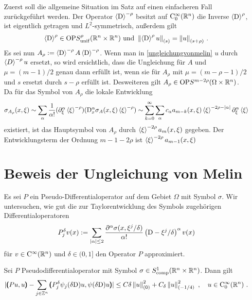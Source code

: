 Zuerst soll die allgemeine Situation im Satz auf einen einfacheren Fall zurückgeführt werden. Der Operator $\braket{\mathrm D}^{-\rho}$ besitzt auf $\mathrm C^\infty_0(\mathbb R^n)$ die Inverse $\braket{\mathrm D}^{\rho}$, ist eigentlich getragen und $L^2$-symmetrisch, außerdem gilt
\begin{align*}
\braket{\mathrm D}^\rho\in\mathrm{OP} S_\mathrm{unif}^\rho(\mathbb R^n\times\mathbb R^n)\text{ und }\left\lVert\braket{\mathrm D}^\rho u\right\rVert_{(s)}=\left\lVert u\right\rVert_{(s+\rho)}\,.
\end{align*}
Es sei nun $A_\rho:=\braket{\mathrm D}^{-\rho}A\braket{\mathrm D}^{-\rho}$. Wenn man in \eqref{ungleichungvonmelin} $u$ durch $\braket{D}^{-\rho}u$ ersetzt, so wird ersichtlich, dass die Ungleichung für $A$ und $\mu=(m-1)/2$ genau dann erfüllt ist, wenn sie für $A_\rho$ mit $\mu=(m-\rho-1)/2$ und $s$ ersetzt durch $s-\rho$ erfüllt ist. Desweiteren gilt $A_\rho\in \mathrm{OP}S^{m-2\rho}(\Omega\times\mathbb R^n)$. Da für das Symbol von $A_\rho$ die lokale  Entwicklung
\begin{align*}
\sigma_{A_\rho}(x,\xi) \sim \sum_{\alpha}\frac 1 {\alpha!} (\partial_\xi^\alpha\braket{\xi}^{-\rho})(\mathrm D_x^\alpha \sigma_{A}(x,\xi)\braket{\xi}^{-\rho}) \sim \sum_{k=0}^\infty\sum_{\alpha} c_\alpha a_{m-k}(x,\xi)\braket{\xi}^{-2\rho-\lvert\alpha\rvert}\partial^\alpha_\xi\braket{\xi}
\end{align*}
existiert, ist das Hauptsymbol von $A_\rho$ durch $\braket{\xi}^{-2\rho}a_m(x,\xi)$ gegeben. Der Entwicklungsterm der Ordnung $m-1-2\rho$ ist $\braket{\xi}^{-2\rho}a_{m-1}(x,\xi)$

\section{Beweis der Ungleichung von Melin}


Es sei $P$ ein Pseudo-Differentialoperator auf dem Gebiet $\Omega$ mit Symbol $\sigma$. Wir untersuchen, wie gut die zur Taylorentwicklung des Symbols zugehörigen Differentialoperatoren
\begin{align}
 P_j^\delta v (x):=\sum_{\lvert\alpha\rvert \le 2} \frac{\partial ^\alpha\sigma(x,\xi^j/\delta)}{\alpha!}\left( \mathrm D - \xi^j/\delta\right)^\alpha v(x)
\end{align}
für $v\in\mathrm {C}^\infty(\mathbb R^n)$ und $\delta\in(0,1]$ den Operator $P$ approximiert.

\begin{lem}
Sei $P$ Pseudodifferentialoperator mit Symbol $\sigma\in S^1_{\rm comp}(\mathbb R^n\times\mathbb R^n)$. Dann gilt
\begin{align}\label{hilfsungl1}
\lvert
\pmb(P u,u\pmb) - \sum_{j\in\mathbb Z^n}\pmb( P_j^\delta\psi_j(\delta\mathrm D )u, \psi(\delta\mathrm D )u \pmb)
\rvert
\le C\delta \left\lVert u\right\rVert ^2_{(0)} + C_\delta \left\lVert u\right\rVert ^2_{(-1/4)}\ ,\quad u\in\mathrm {C}^\infty_0(\mathbb R^n)\ .
\end{align}
\end{lem}


